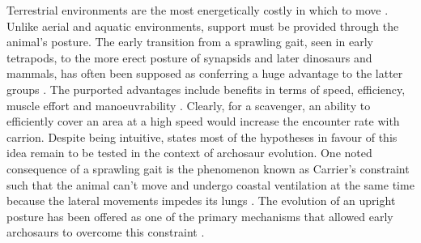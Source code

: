 \documentclass[a4paper,12pt]{article}
\begin{document}
Terrestrial environments are the most energetically costly in which to move \citep{tucker1975energetic}. 
Unlike aerial and aquatic environments, support must be provided through the animal's posture. 
The early transition from a sprawling gait, seen in early tetrapods, to the more erect posture of synapsids and later dinosaurs and mammals, has often been supposed as conferring a huge advantage to the latter groups \citep{sullivan2015posture}.
The purported advantages include benefits in terms of speed, efficiency, muscle effort and manoeuvrability \citep{sullivan2015posture}.
Clearly, for a scavenger, an ability to efficiently cover an area at a high speed would increase the encounter rate with carrion. 
Despite being intuitive, \cite{sullivan2015posture} states most of the hypotheses in favour of this idea remain to be tested in the context of archosaur evolution. 
One noted consequence of a sprawling gait is the phenomenon known as Carrier's constraint such that the animal can't move and undergo coastal ventilation at the same time because the lateral movements impedes its lungs \citep{carrier1987evolution}. 
The evolution of an upright posture has been offered as one of the primary mechanisms that allowed early archosaurs to overcome this constraint \citep{uriona2008recruitment}. 
\end{document}
